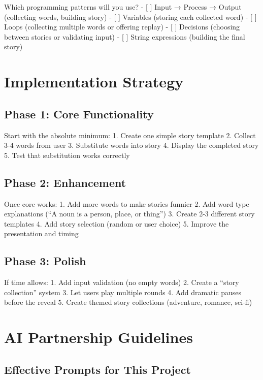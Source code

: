 \documentclass[
  letterpaper,
  DIV=11,
  numbers=noendperiod,
  oneside]{scrreprt}
\begin{document}
Which programming patterns will you use? - {[} {]} Input → Process →
Output (collecting words, building story) - {[} {]} Variables (storing
each collected word) - {[} {]} Loops (collecting multiple words or
offering replay) - {[} {]} Decisions (choosing between stories or
validating input) - {[} {]} String expressions (building the final
story)

\section{Implementation Strategy}\label{implementation-strategy-1}

\subsection{Phase 1: Core
Functionality}\label{phase-1-core-functionality-1}

Start with the absolute minimum: 1. Create one simple story template 2.
Collect 3-4 words from user 3. Substitute words into story 4. Display
the completed story 5. Test that substitution works correctly

\subsection{Phase 2: Enhancement}\label{phase-2-enhancement-1}

Once core works: 1. Add more words to make stories funnier 2. Add word
type explanations (``A noun is a person, place, or thing'') 3. Create
2-3 different story templates 4. Add story selection (random or user
choice) 5. Improve the presentation and timing

\subsection{Phase 3: Polish}\label{phase-3-polish-1}

If time allows: 1. Add input validation (no empty words) 2. Create a
``story collection'' system 3. Let users play multiple rounds 4. Add
dramatic pauses before the reveal 5. Create themed story collections
(adventure, romance, sci-fi)

\section{AI Partnership Guidelines}\label{ai-partnership-guidelines-1}

\subsection{Effective Prompts for This
Project}\label{effective-prompts-for-this-project-1}
\end{document}
